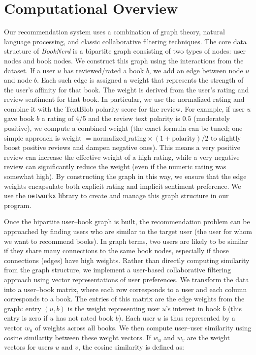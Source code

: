\documentclass[11pt]{article}
\begin{document}
\section{Computational Overview}
Our recommendation system uses a combination of graph theory, natural language processing, and classic collaborative filtering techniques. The core data structure of \textit{BookNerd} is a bipartite graph consisting of two types of nodes: user nodes and book nodes. We construct this graph using the interactions from the dataset. If a user $u$ has reviewed/rated a book $b$, we add an edge between node $u$ and node $b$. Each such edge is assigned a weight that represents the strength of the user’s affinity for that book. The weight is derived from the user’s rating and review sentiment for that book. In particular, we use the normalized rating and combine it with the TextBlob polarity score for the review. For example, if user $u$ gave book $b$ a rating of 4/5 and the review text polarity is $0.5$ (moderately positive), we compute a combined weight (the exact formula can be tuned; one simple approach is weight $= \text{normalized\_rating} \times (1 + \text{polarity})/2$ to slightly boost positive reviews and dampen negative ones). This means a very positive review can increase the effective weight of a high rating, while a very negative review can significantly reduce the weight (even if the numeric rating was somewhat high). By constructing the graph in this way, we ensure that the edge weights encapsulate both explicit rating and implicit sentiment preference. We use the \texttt{networkx} library to create and manage this graph structure in our program.

Once the bipartite user–book graph is built, the recommendation problem can be approached by finding users who are similar to the target user (the user for whom we want to recommend books). In graph terms, two users are likely to be similar if they share many connections to the same book nodes, especially if those connections (edges) have high weights. Rather than directly computing similarity from the graph structure, we implement a user-based collaborative filtering approach using vector representations of user preferences. We transform the data into a user–book matrix, where each row corresponds to a user and each column corresponds to a book. The entries of this matrix are the edge weights from the graph: entry $(u,b)$ is the weight representing user $u$’s interest in book $b$ (this entry is zero if $u$ has not rated book $b$). Each user $u$ is thus represented by a vector $w_{u}$ of weights across all books. We then compute user–user similarity using cosine similarity between these weight vectors. If $w_{u}$ and $w_{v}$ are the weight vectors for users $u$ and $v$, the cosine similarity is defined as: 
\end{document}
